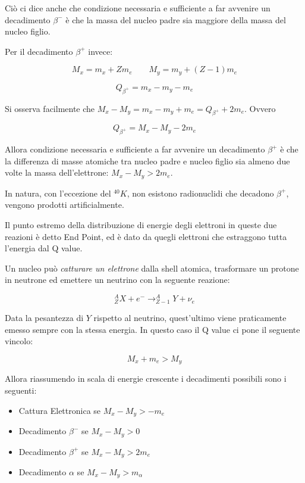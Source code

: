 Ciò ci dice anche che condizione necessaria e sufficiente a far avvenire un decadimento $\beta^-$ è che la massa del nucleo padre sia maggiore della massa del nucleo figlio.

Per il decadimento $\beta^+$ invece:

\begin{equation}
M_x=m_x+Zm_e \qquad M_y=m_y+(Z-1)m_e
\end{equation}

\begin{equation}
Q_{\beta^+}=m_x-m_y-m_e
\end{equation}

Si osserva facilmente che $M_x-M_y=m_x-m_y+m_e=Q_{\beta^+}+2m_e$.
Ovvero

\begin{equation}
Q_{\beta^+}=M_x-M_y-2m_e
\end{equation}

Allora condizione necessaria e sufficiente a far avvenire un decadimento $\beta^+$ è che la differenza di masse atomiche tra nucleo padre e nucleo figlio sia almeno due volte la massa dell'elettrone: $M_x-M_y>2m_e$.

In natura, con l'eccezione del $^{40}K$, non esistono radionuclidi che decadono $\beta^+$, vengono prodotti artificialmente.

Il punto estremo della distribuzione di energie degli elettroni in queste due reazioni è detto End Point, ed è dato da quegli elettroni che estraggono tutta l'energia dal Q value.

Un nucleo può \emph{catturare un elettrone} dalla shell atomica, trasformare un protone in neutrone ed emettere un neutrino con la seguente reazione:

\begin{equation}
^A_ZX+e^- \longrightarrow _{Z-1}^AY+\nu_e
\end{equation}

Data la pesantezza di $Y$ rispetto al neutrino, quest'ultimo viene praticamente emesso sempre con la stessa energia. In questo caso il Q value ci pone il seguente vincolo:

\begin{equation}
M_x+m_e>M_y
\end{equation}

Allora riassumendo in scala di energie crescente i decadimenti possibili sono i seguenti:

\begin{itemize}
\item Cattura Elettronica se $M_x-M_y>-m_e$
\item Decadimento $\beta^-$ se $M_x-M_y>0$
\item Decadimento $\beta^+$ se $M_x-M_y>2m_e$
\item Decadimento $\alpha$ se $M_x-M_y>m_{\alpha}$
\end{itemize}

